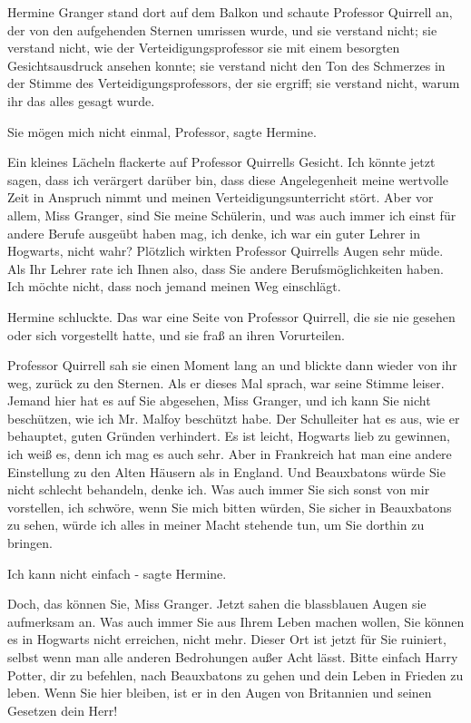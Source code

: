 Hermine Granger stand dort auf dem Balkon und schaute Professor Quirrell an, der
von den aufgehenden Sternen umrissen wurde, und sie verstand nicht; sie verstand
nicht, wie der Verteidigungsprofessor sie mit einem besorgten Gesichtsausdruck
ansehen konnte; sie verstand nicht den Ton des Schmerzes in der Stimme des
Verteidigungsprofessors, der sie ergriff; sie verstand nicht, warum ihr das
alles gesagt wurde.

\glqq{}Sie mögen mich nicht einmal, Professor\grqq{}, sagte Hermine.

Ein kleines Lächeln flackerte auf Professor Quirrells Gesicht. \glqq{}Ich könnte
jetzt sagen, dass ich verärgert darüber bin, dass diese Angelegenheit meine
wertvolle Zeit in Anspruch nimmt und meinen Verteidigungsunterricht stört. Aber
vor allem, Miss Granger, sind Sie meine Schülerin, und was auch immer ich einst
für andere Berufe ausgeübt haben mag, ich denke, ich war ein guter Lehrer in
Hogwarts, nicht wahr?\grqq{} Plötzlich wirkten Professor Quirrells Augen sehr
müde. \glqq{}Als Ihr Lehrer rate ich Ihnen also, dass Sie andere
Berufsmöglichkeiten haben. Ich möchte nicht, dass noch jemand meinen Weg
einschlägt.\grqq{}

Hermine schluckte. Das war eine Seite von Professor Quirrell, die sie nie
gesehen oder sich vorgestellt hatte, und sie fraß an ihren Vorurteilen.

Professor Quirrell sah sie einen Moment lang an und blickte dann wieder von ihr
weg, zurück zu den Sternen. Als er dieses Mal sprach, war seine Stimme leiser.
\glqq{}Jemand hier hat es auf Sie abgesehen, Miss Granger, und ich kann Sie nicht
beschützen, wie ich Mr. Malfoy beschützt habe. Der Schulleiter hat es aus, wie
er behauptet, guten Gründen verhindert. Es ist leicht, Hogwarts lieb zu
gewinnen, ich weiß es, denn ich mag es auch sehr. Aber in Frankreich hat man
eine andere Einstellung zu den Alten Häusern als in England. Und Beauxbatons
würde Sie nicht schlecht behandeln, denke ich. Was auch immer Sie sich sonst von
mir vorstellen, ich schwöre, wenn Sie mich bitten würden, Sie sicher in
Beauxbatons zu sehen, würde ich alles in meiner Macht stehende tun, um Sie
dorthin zu bringen.\grqq{}

\glqq{}Ich kann nicht einfach -\grqq{} sagte Hermine.

\glqq{}Doch, das können Sie, Miss Granger.\grqq{} Jetzt sahen die blassblauen
Augen sie aufmerksam an. \glqq{}Was auch immer Sie aus Ihrem Leben machen wollen,
Sie können es in Hogwarts nicht erreichen, nicht mehr. Dieser Ort ist jetzt für
Sie ruiniert, selbst wenn man alle anderen Bedrohungen außer Acht lässt. Bitte
einfach Harry Potter, dir zu befehlen, nach Beauxbatons zu gehen und dein Leben
in Frieden zu leben. Wenn Sie hier bleiben, ist er in den Augen von Britannien
und seinen Gesetzen dein Herr!\grqq{}

